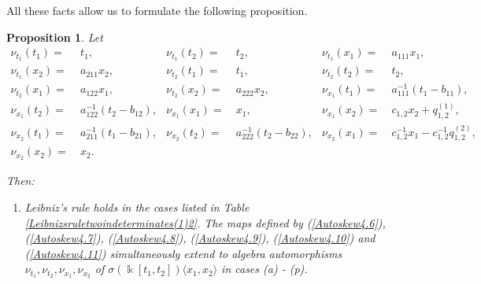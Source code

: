 \documentclass{amsart}
\newtheorem{proposition}[theorem]{Proposition}
\theoremstyle{definition}
\theoremstyle{remark}
\numberwithin{equation}{section}
\begin{document}
All these facts allow us to formulate the following proposition.

\begin{proposition}\label{autoSkewPBW22} 
Let
\begin{align}
   \nu_{t_1}(t_1) = &\ t_1, & \nu_{t_1}(t_2) = &\ t_2, & \nu_{t_1}(x_1) = &\ a_{111}x_1,  \label{Autoskew4.6} \\ 
   \nu_{t_1}(x_2) = &\ a_{211}x_2, & \nu_{t_2}(t_1) = &\ t_1, & \nu_{t_2}(t_2) = &\ t_2,  \label{Autoskew4.7} \\
   \nu_{t_2}(x_1) = &\ a_{122}x_1, & \nu_{t_2}(x_2) = &\ a_{222}x_2, & \nu_{x_1}(t_1) = &\ a_{111}^{-1}(t_1-b_{11}),  \label{Autoskew4.8} \\
    \nu_{x_1}(t_2) = &\ a_{122}^{-1}(t_2-b_{12}), & \nu_{x_1}(x_1) = &\ x_1, &  \nu_{x_1}(x_2) = &\ c_{1,2}x_2+q_{1,2}^{(1)}, \label{Autoskew4.9} \\
    \nu_{x_2}(t_1) = &\ a_{211}^{-1}(t_1-b_{21}), & \nu_{x_2}(t_2) = &\ a_{222}^{-1}(t_2-b_{22}), & \nu_{x_2}(x_1) = &\ c_{1,2}^{-1}x_1-c_{1,2}^{-1}q_{1,2}^{(2)}, \label{Autoskew4.10} \\
    \nu_{x_2}(x_2) = &\ x_2. \label{Autoskew4.11}
\end{align}

Then:
\begin{enumerate}
\item [\rm (1)] Leibniz's rule holds in the cases listed in Table \ref{Leibnizsruletwoindeterminates(1)2}. The maps defined by {\rm (}\ref{Autoskew4.6}{\rm )}, {\rm (}\ref{Autoskew4.7}{\rm )}, {\rm (}\ref{Autoskew4.8}{\rm )}, {\rm (}\ref{Autoskew4.9}{\rm )}, {\rm (}\ref{Autoskew4.10}{\rm )} and {\rm (}\ref{Autoskew4.11}{\rm )} simultaneously extend to algebra automorphisms $\nu_{t_1}, \nu_{t_2}, \nu _{x_1}, \nu_{x_2}$ of $\sigma(\Bbbk[t_1, t_2])\langle x_1, x_2\rangle$ in cases {\rm (a) - (p)}.
\end{enumerate}


\end{proposition}
\end{document}
